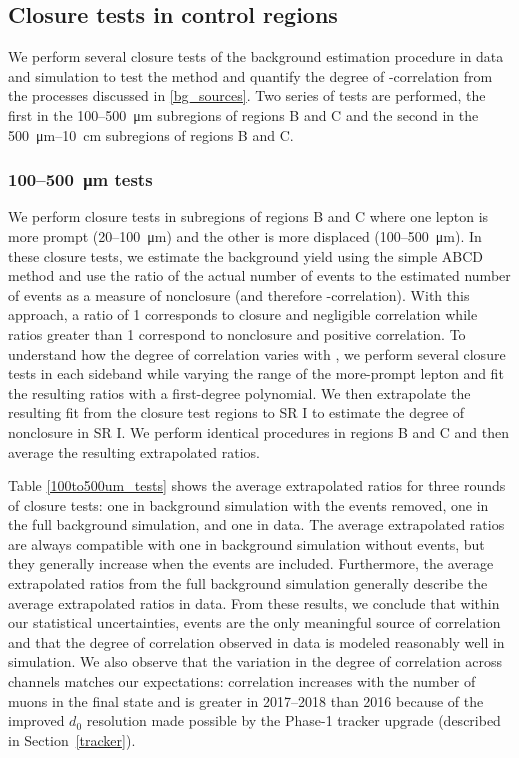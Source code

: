 \subsection{Closure tests in control regions}
\label{cr_closure_tests}
We perform several closure tests of the background estimation procedure in data and simulation to test the method and quantify the degree of \ada-\adb correlation from the processes discussed in \ref{bg_sources}. Two series of tests are performed, the first in the \num{100}--\SI{500}{\um} subregions of regions B and C and the second in the \SI{500}{\um}--\SI{10}{\cm} subregions of regions B and C.

\subsubsection{\num{100}--\SI{500}{\um} tests}
We perform closure tests in subregions of regions B and C where one lepton is more prompt (\num{20}--\SI{100}{\um}) and the other is more displaced (\num{100}--\SI{500}{\um}). In these closure tests, we estimate the background yield using the simple ABCD method and use the ratio of the actual number of events to the estimated number of events as a measure of nonclosure (and therefore \ada-\adb correlation). With this approach, a ratio of 1 corresponds to closure and negligible correlation while ratios greater than 1 correspond to nonclosure and positive correlation. To understand how the degree of correlation varies with \ad, we perform several closure tests in each sideband while varying the \ad range of the more-prompt lepton and fit the resulting ratios with a first-degree polynomial. We then extrapolate the resulting fit from the closure test regions to SR I to estimate the degree of nonclosure in SR I. We perform identical procedures in regions B and C and then average the resulting extrapolated ratios.

Table \ref{100to500um_tests} shows the average extrapolated ratios for three rounds of closure tests: one in background simulation with the \ztautaull events removed, one in the full background simulation, and one in data. The average extrapolated ratios are always compatible with one in background simulation without \ztautaull events, but they generally increase when the \ztautaull events are included. Furthermore, the average extrapolated ratios from the full background simulation generally describe the average extrapolated ratios in data. From these results, we conclude that within our statistical uncertainties, \ztautaull events are the only meaningful source of correlation and that the degree of correlation observed in data is modeled reasonably well in simulation. We also observe that the variation in the degree of correlation across channels matches our expectations: correlation increases with the number of muons in the final state and is greater in 2017--2018 than 2016 because of the improved $d_0$ resolution made possible by the Phase-1 tracker upgrade (described in Section~\ref{tracker}).

